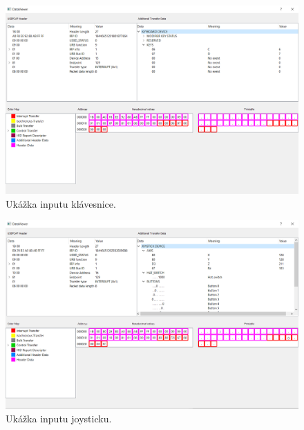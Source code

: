 \begin{figure}[!htb]
	\centering
	\includegraphics[width=\textwidth]{img/kap06_uk_keyboard}
	\caption{Ukážka inputu klávesnice.}
	\label{obr:kap6:uk_input_keyboard}
\end{figure}

\begin{figure}[!htb]
	\centering
	\includegraphics[width=\textwidth]{img/kap06_uk_joystick}
	\caption{Ukážka inputu joysticku.}
	\label{obr:kap6:uk_input_joystick}
\end{figure}









































